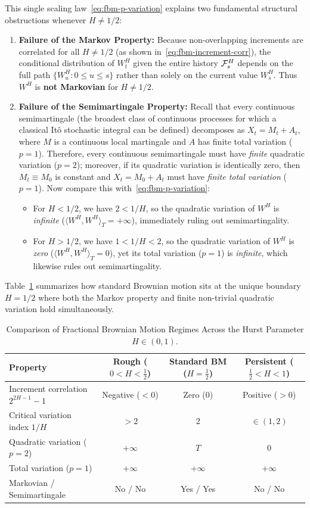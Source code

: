 This single scaling law~\eqref{eq:fbm-p-variation} explains two fundamental structural obstructions whenever $H \neq 1/2$:
\begin{enumerate}
    \item \textbf{Failure of the Markov Property:} Because non-overlapping increments are correlated for all $H \neq 1/2$ (as shown in~\eqref{eq:fbm-increment-corr}), the conditional distribution of $W_t^H$ given the entire history $\mathcal{F}_s^H$ depends on the full path $\{W_u^H : 0 \le u \le s\}$ rather than solely on the current value $W_s^H$. Thus $W^H$ is \textbf{not Markovian} for $H \neq 1/2$.
    \item \textbf{Failure of the Semimartingale Property:} Recall that every continuous semimartingale (the broadest class of continuous processes for which a classical It\^o stochastic integral can be defined) decomposes as $X_t = M_t + A_t$, where $M$ is a continuous local martingale and $A$ has finite total variation ($p = 1$). Therefore, every continuous semimartingale must have \emph{finite} quadratic variation ($p = 2$); moreover, if its quadratic variation is identically zero, then $M_t \equiv M_0$ is constant and $X_t = M_0 + A_t$ must have \emph{finite total variation} ($p = 1$). Now compare this with~\eqref{eq:fbm-p-variation}:
    \begin{itemize}
        \item For $H < 1/2$, we have $2 < 1/H$, so the quadratic variation of $W^H$ is \emph{infinite} ($\langle W^H, W^H \rangle_T = +\infty$), immediately ruling out semimartingality.
        \item For $H > 1/2$, we have $1 < 1/H < 2$, so the quadratic variation of $W^H$ is \emph{zero} ($\langle W^H, W^H \rangle_T = 0$), yet its total variation ($p = 1$) is \emph{infinite}, which likewise rules out semimartingality.
    \end{itemize}
\end{enumerate}

Table~\ref{tab:bm-vs-fbm} summarizes how standard Brownian motion sits at the unique boundary $H = 1/2$ where both the Markov property and finite non-trivial quadratic variation hold simultaneously.

\begin{table}[!ht]
\centering
\caption{Comparison of Fractional Brownian Motion Regimes Across the Hurst Parameter $H \in (0, 1)$.}
\label{tab:bm-vs-fbm}
\begin{tabular}{lccc}
\toprule
Property & Rough ($0 < H < \tfrac{1}{2}$) & Standard BM ($H = \tfrac{1}{2}$) & Persistent ($\tfrac{1}{2} < H < 1$) \\
\midrule
Increment correlation $2^{2H-1} - 1$ & Negative ($< 0$) & Zero ($0$) & Positive ($> 0$) \\
Critical variation index $1/H$ & $> 2$ & $2$ & $\in (1, 2)$ \\
Quadratic variation ($p = 2$) & $+\infty$ & $T$ & $0$ \\
Total variation ($p = 1$) & $+\infty$ & $+\infty$ & $+\infty$ \\
Markovian / Semimartingale & No / No & Yes / Yes & No / No \\
\bottomrule
\end{tabular}
\end{table}

